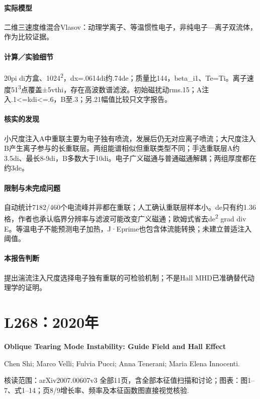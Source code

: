 \paragraph{实际模型}二维三速度维混合Vlasov：动理学离子、等温惯性电子，非纯电子—离子双流体，作为比较证据。

\paragraph{计算／实验细节}20pi di方盒、1024\textsuperscript{2}，dx=.0614di约.74de；质量比144，beta\_i1、Te=Ti。离子速度51\textsuperscript{3}点覆盖±5vthi，存在高波数谱滤波。初始磁扰动rms.15；A注入.1<=kdi<=.6，B至.3；另.21幅值比较只文字报告。

\paragraph{核实的发现}小尺度注入A中重联主要为电子独有喷流，发展后仍无对应离子喷流；大尺度注入B产生离子参与的长重联层。两组能谱相似但重联类型不同；手选重联层A约3.5di、最长8-9di，B多数大于10di。电子广义磁通与普通磁通解耦；两组厚度都在约3de。

\paragraph{限制与未完成问题}自动统计7182/460个电流峰并非都在重联；人工确认重联层样本小。de只有约1.36格，作者也承认临界分辨率与滤波可能改变广义磁通；欧姆式省去de\textsuperscript{2} grad div E。等温电子不能预测电子加热，J·Eprime也包含体流能转换；未建立普适注入阈值。

\paragraph{本报告判断}提出湍流注入尺度选择电子独有重联的可检验机制；不是Hall MHD已准确替代动理学的证明。

\section{L268：2020年}\label{paper:L268}

\textbf{Oblique Tearing Mode Instability: Guide Field and Hall Effect}\citep{L268}\

Chen Shi;  Marco Velli;  Fulvia Pucci;  Anna Tenerani;  Maria Elena Innocenti.

\textsf{核读范围：}arXiv2007.00607v3 全部11页，含全部本征值扫描和讨论；\textsf{图表：}图1–7、式1–14；页8/9增长率、频率及本征函数图直接视觉核验.

